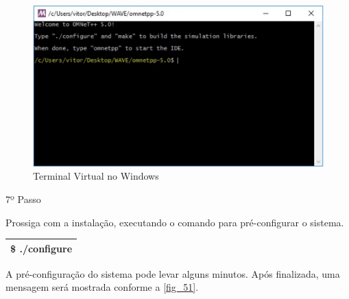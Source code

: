 \documentclass[
12pt,				%
openright,			%
oneside,			%
a4paper,			%
brazil,				%
]{abntex2}
\begin{document}
{\begin{anexosenv}
	                \begin{figure} [H]
		                \centering
		                \includegraphics[scale=.35]{figuras/aneB/50TerminalVirtualLinuxNoWindows}
		                \caption{\label{fig_50}Terminal Virtual no Windows}
	                \end{figure}
                    
                    
                    \newpage

                	\begin{description}
		                \item[7º Passo]
		            \end{description}
		            \par Prossiga com a instalação, executando o comando para pré-configurar o sistema.
		
		            \begin{table}[H]
			            \renewcommand{\arraystretch}{1.5}
		                \begin{tabular}{|p{15.5cm}|}
			                \hline
                            \$ ./configure \\
			                \hline
			            \end{tabular}
		            \end{table}
		            
		            \par A pré-configuração do sistema pode levar alguns minutos. Após finalizada, uma mensagem será mostrada conforme a \autoref{fig_51}.
		            

\end{anexosenv}}
\end{document}
